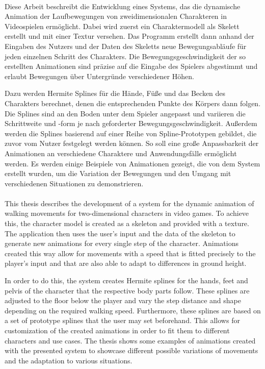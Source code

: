 \kurzfassung

\paragraph*{}
Diese Arbeit beschreibt die Entwicklung eines Systems, das die dynamische Animation der Laufbewegungen von zweidimensionalen Charakteren in Videospielen ermöglicht. Dabei wird zuerst ein Charaktermodell als Skelett erstellt und mit einer Textur versehen. Das Programm erstellt dann anhand der Eingaben des Nutzers und der Daten des Skeletts neue Bewegungsabläufe für jeden einzelnen Schritt des Charakters. Die Bewegungsgeschwindigkeit der so erstellten Animationen sind präzise auf die Eingabe des Spielers abgestimmt und erlaubt Bewegungen über Untergründe verschiedener Höhen.

Dazu werden Hermite Splines für die Hände, Füße und das Becken des Charakters berechnet, denen die entsprechenden Punkte des Körpers dann folgen. Die Splines sind an den Boden unter dem Spieler angepasst und variieren die Schrittweite und -form je nach geforderter Bewegungsgeschwindigkeit.
Außerdem werden die Splines basierend auf einer Reihe von Spline-Prototypen gebildet, die zuvor vom Nutzer festgelegt werden können. So soll eine große Anpassbarkeit der Animationen an verschiedene Charaktere und Anwendungsfälle ermöglicht werden.
Es werden einige Beispiele von Animationen gezeigt, die von dem System erstellt wurden, um die Variation der Bewegungen und den Umgang mit verschiedenen Situationen zu demonstrieren.


\paragraph*{}
This thesis describes the development of a system for the dynamic animation of walking movements for two-dimensional characters in video games. To achieve this, the character model is created as a skeleton and provided with a texture. The application then uses the user's input and the data of the skeleton to generate new animations for every single step of the character. Animations created this way allow for movements with a speed that is fitted precisely to the player's input and that are also able to adapt to differences in ground height.

In order to do this, the system creates Hermite splines for the hands, feet and pelvis of the character that the respective body parts follow. These splines are adjusted to the floor below the player and vary the step distance and shape depending on the required walking speed.
Furthermore, these splines are based on a set of prototype splines that the user may set beforehand. This allows for customization of the created animations in order to fit them to different characters and use cases.
The thesis shows some examples of animations created with the presented system to showcase different possible variations of movements and the adaptation to various situations.